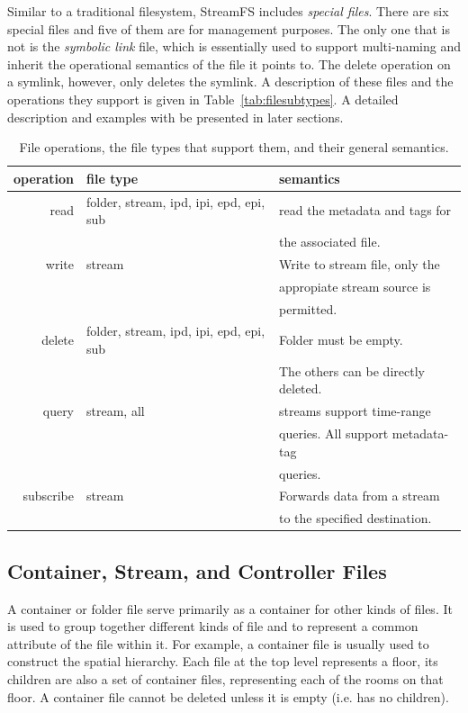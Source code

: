 Similar to a traditional filesystem, StreamFS includes \emph{special files}.  There are six special files and five of them 
are for management purposes.  The only one that is not is the \emph{symbolic link} file, which is essentially used to support
multi-naming and inherit the operational semantics of the file it points to.  The delete operation on a symlink, however,
only deletes the symlink.  A description of these files and the operations they support is given in Table~\ref{tab:filesubtypes}.
A detailed description and examples with be presented in later sections.


\begin{table}[h]
\begin{center}
\begin{tabular}{| r | l | l |}
	\hline
	\textbf{operation} & \textbf{file type} & \textbf{semantics} \\ \hline
	read & folder, stream, ipd, ipi, epd, epi, sub & read the metadata and tags for \\
		 &										   & the associated file. \\ \hline
	write &  stream & Write to stream file, only the \\ 
		  & 		& appropiate stream source is \\
		  &			& permitted.\\ \hline
	delete & folder, stream, ipd, ipi, epd, epi, sub & Folder must be empty.  \\
		   & 										 & The others can be directly deleted. \\ \hline
	query &  stream, all & streams support time-range   \\
		  &			     & queries. All support metadata-tag \\ 
		  &				 & queries. \\ \hline
	subscribe & stream & Forwards data from a stream \\
			  &		   & to the specified destination.\\
	\hline
\end{tabular}
\caption{File operations, the file types that support them, and their general semantics.}
\label{tab:semantics}
\end{center}
\end{table}

\subsection{Container, Stream, and Controller Files}
A container or folder file serve primarily as a container for other kinds of files.  It is used to group together different kinds of file and
to represent a common attribute of the file within it.  For example, a container file is usually used to construct the spatial hierarchy.
Each file at the top level represents a floor, its children are also a set of container files, representing each of the rooms on that floor.
A container file cannot be deleted unless it is empty (i.e. has no children).

